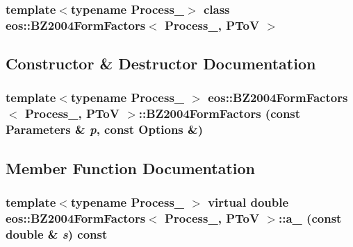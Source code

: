 \subsubsection*{template$<$typename Process\_\-$>$ class eos::BZ2004FormFactors$<$ Process\_\-, PToV $>$}



\subsection{Constructor \& Destructor Documentation}
\hypertarget{classeos_1_1BZ2004FormFactors_3_01Process___00_01PToV_01_4_a225d97783a8fd060a4c031f5217992cf}{
\subsubsection[{BZ2004FormFactors}]{\setlength{\rightskip}{0pt plus 5cm}template$<$typename Process\_\- $>$ eos::BZ2004FormFactors$<$ Process\_\-, {\bf PToV} $>$::BZ2004FormFactors (const {\bf Parameters} \& {\em p}, \/  const {\bf Options} \&)}}
\label{classeos_1_1BZ2004FormFactors_3_01Process___00_01PToV_01_4_a225d97783a8fd060a4c031f5217992cf}


\subsection{Member Function Documentation}
\hypertarget{classeos_1_1BZ2004FormFactors_3_01Process___00_01PToV_01_4_a67cc70f2263f1dfec23057c36060ef22}{
\subsubsection[{a\_\-0}]{\setlength{\rightskip}{0pt plus 5cm}template$<$typename Process\_\- $>$ virtual double eos::BZ2004FormFactors$<$ Process\_\-, {\bf PToV} $>$::a\_ (const double \& {\em s}) const}}
\label{classeos_1_1BZ2004FormFactors_3_01Process___00_01PToV_01_4_a67cc70f2263f1dfec23057c36060ef22}


